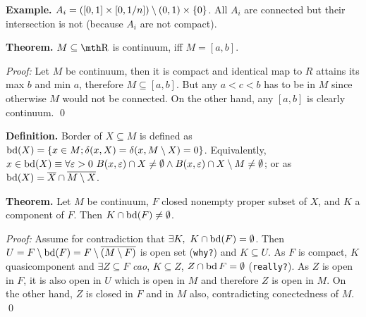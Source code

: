 {\bf Example.} $A_i = ([0,1]\times[0,1/n])\setminus (0,1)\times \{0\}$. All $A_i$ are
connected but their intersection is not (because $A_i$ are not compact).

{\bf Theorem.} $M\subseteq \R$ is continuum, iff $M=[a,b]$.

{\it Proof:} Let $M$ be continuum, then it is compact and identical map to $R$
attains its max $b$ and min $a$, therefore $M\subseteq [a,b]$. But any $a<c<b$
has to be in $M$ since otherwise $M$ would not be connected. On the other hand,
any $[a,b]$ is clearly continuum.
\qed

{\bf Definition.} Border of $X\subseteq M$ is defined as
$\mathop{\rm bd}(X) = \{x\in M;\delta(x,X)=\delta(x,M\setminus X) = 0\}$. Equivalently, $x\in
\mathop{\rm bd}(X) \equiv \forall \varepsilon > 0\ B(x,\varepsilon)\cap X\neq \emptyset \wedge 
B(x,\varepsilon)\cap X\setminus M\neq \emptyset$; or as $\mathop{\rm bd}(X) =
\overline{X}\cap\overline{M\setminus X}$.

{\bf Theorem.} Let $M$ be continuum, $F$ closed nonempty proper subset of $X$,
and $K$ a component of $F$. Then $K\cap \mathop{\rm bd}(F)\neq \emptyset$.

{\it Proof:} Assume for contradiction that $\exists K,\ K\cap \mathop{\rm bd}(F) = \emptyset$. 
Then $U = F\setminus \mathop{\rm bd}(F) = F\setminus \overline{(M\setminus F)}$ is open set ({\tt why?}) 
and $K\subseteq U$. As $F$ is compact, $K$ quasicomponent and $\exists
Z\subseteq F$ {\it cao}, $K\subseteq Z$, $Z\cap \mathop{\rm bd} F = \emptyset$ ({\tt really?}). As
$Z$ is open in $F$, it is also open in $U$ which is open in $M$ and therefore
$Z$ is open in $M$. On the other hand, $Z$ is closed in $F$ and in $M$ also,
contradicting conectedness of $M$.
\qed
